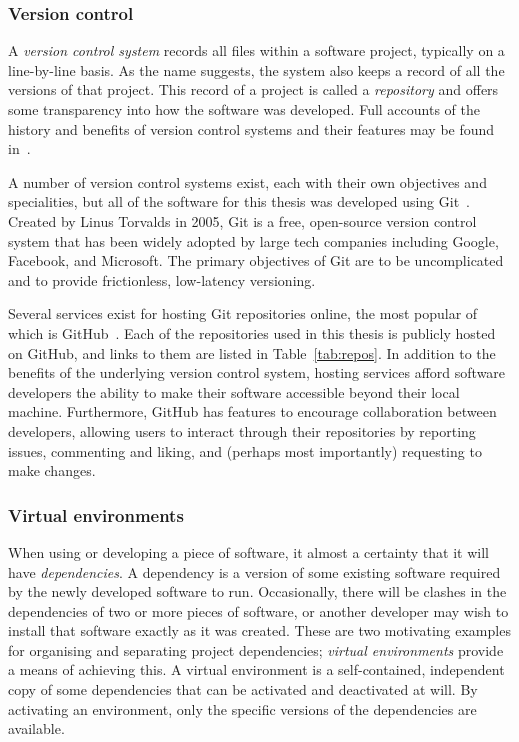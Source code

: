 \subsubsection{Version control}

A \emph{version control system} records all files within a software project,
typically on a line-by-line basis. As the name suggests, the system also keeps a
record of all the versions of that project. This record of a project is called a
\emph{repository} and offers some transparency into how the software was
developed. Full accounts of the history and benefits of version control systems
and their features may be found in~\cite{Ruparelia2010,Zolkifli2018}.

A number of version control systems exist, each with their own objectives and
specialities, but all of the software for this thesis was developed using
Git~\cite{git}. Created by Linus Torvalds in 2005, Git is a free, open-source
version control system that has been widely adopted by large tech companies
including Google, Facebook, and Microsoft. The primary objectives of Git are to
be uncomplicated and to provide frictionless, low-latency versioning.

Several services exist for hosting Git repositories online, the most popular of
which is GitHub~\cite{github}. Each of the repositories used in this thesis is
publicly hosted on GitHub, and links to them are listed in
Table~\ref{tab:repos}. In addition to the benefits of the underlying version
control system, hosting services afford software developers the ability to make
their software accessible beyond their local machine. Furthermore, GitHub has
features to encourage collaboration between developers, allowing users to
interact through their repositories by reporting issues, commenting and
liking, and (perhaps most importantly) requesting to make changes.

\subsubsection{Virtual environments}

When using or developing a piece of software, it almost a certainty that it will
have \emph{dependencies}. A dependency is a version of some existing software
required by the newly developed software to run. Occasionally, there will be
clashes in the dependencies of two or more pieces of software, or another
developer may wish to install that software exactly as it was created. These are
two motivating examples for organising and separating project dependencies;
\emph{virtual environments} provide a means of achieving this. A virtual
environment is a self-contained, independent copy of some dependencies that can
be activated and deactivated at will. By activating an environment, only the
specific versions of the dependencies are available.

